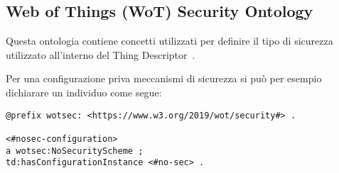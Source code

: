 \subsection{Web of Things (WoT) Security Ontology}
Questa ontologia contiene concetti utilizzati per definire il tipo di sicurezza utilizzato all'interno del Thing Descriptor~\cite{WebofThi54:online}.

\noindent Per una configurazione priva meccanismi di sicurezza si può per esempio dichiarare un individuo come segue:
\begin{verbatim}
@prefix wotsec: <https://www.w3.org/2019/wot/security#> .

<#nosec-configuration>
a wotsec:NoSecurityScheme ;
td:hasConfigurationInstance <#no-sec> .
\end{verbatim}
